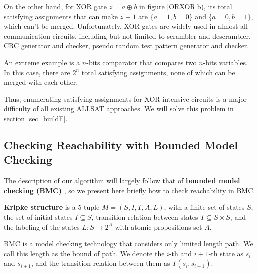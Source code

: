 \documentclass[journal]{IEEEtran}
\begin{document}
On the other hand,
for XOR gate $z= a \oplus b$ in figure \ref{ORXOR}b),
its total satisfying assignments that can make $z\equiv 1$ are $\{a= 1, b= 0\}$ and $\{a= 0, b= 1\}$,
which can't be merged.
Unfortunately, XOR gates are widely used in almost all communication circuits,
including but not limited to scrambler and descrambler,
CRC generator and checker,
pseudo random test pattern generator and checker.

An extreme example is a $n$-bits comparator that compares two $n$-bits variables.
In this case,
there are $2^n$ total satisfying assignments,
none of which can be merged with each other.

Thus, enumerating satisfying assignments for XOR intensive circuits is a major difficulty of all existing ALLSAT approaches.
We will solve this problem in section \ref{sec_buildF}.



\subsection{Checking Reachability with Bounded Model Checking}

The description of our algorithm will largely follow that of \textbf{bounded model checking (BMC)} \cite{SMCSAT},
so we present here briefly how to check reachability in BMC.

\vspace{0.2cm}

\begin{definition11}\label{KripkeStructure}
\textbf{Kripke structure} is a 5-tuple $M=(S,I,T,A,L)$, with a finite set of states $S$,
the set of initial states $I\subseteq S$,
transition relation between states $T\subseteq S\times S$,
and the labeling of the states $L:S\rightarrow 2^{A}$ with atomic propositions set $A$.
\end{definition11}

\vspace{0.2cm}

BMC is a model checking technology that considers only limited length path.
We call this length as the bound of path.
We denote the $i$-th and $i+1$-th state as $s_i$ and $s_{i+1}$,
and the transition relation between them as $T(s_i,s_{i+1})$.
\end{document}
